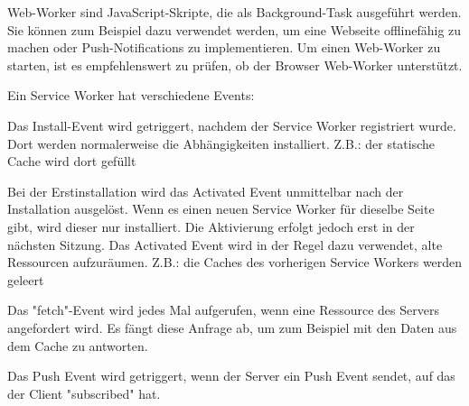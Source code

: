 

Web-Worker sind JavaScript-Skripte, die als Background-Task ausgeführt werden. Sie können zum Beispiel dazu verwendet werden, um eine Webseite offlinefähig zu machen oder Push-Notifications zu implementieren.  Um einen Web-Worker zu starten, ist es empfehlenswert zu prüfen, ob der Browser Web-Worker unterstützt.


Ein Service Worker hat verschiedene Events: 


Das Install-Event wird getriggert, nachdem der Service Worker registriert wurde. Dort werden normalerweise die Abhängigkeiten installiert. Z.B.: der statische Cache wird dort gefüllt 


Bei der Erstinstallation wird das Activated Event unmittelbar nach der Installation ausgelöst. Wenn es einen neuen Service Worker für dieselbe Seite gibt, wird dieser nur installiert. Die Aktivierung erfolgt jedoch erst in der nächsten Sitzung. Das Activated Event wird in der Regel dazu verwendet, alte Ressourcen aufzuräumen. Z.B.: die Caches des vorherigen Service Workers werden geleert


Das "fetch"-Event wird jedes Mal aufgerufen, wenn eine Ressource des Servers angefordert wird. Es fängt diese Anfrage ab, um zum Beispiel mit den Daten aus dem Cache zu antworten.


Das Push Event wird getriggert, wenn der Server ein Push Event sendet, auf das der Client "subscribed" hat.

